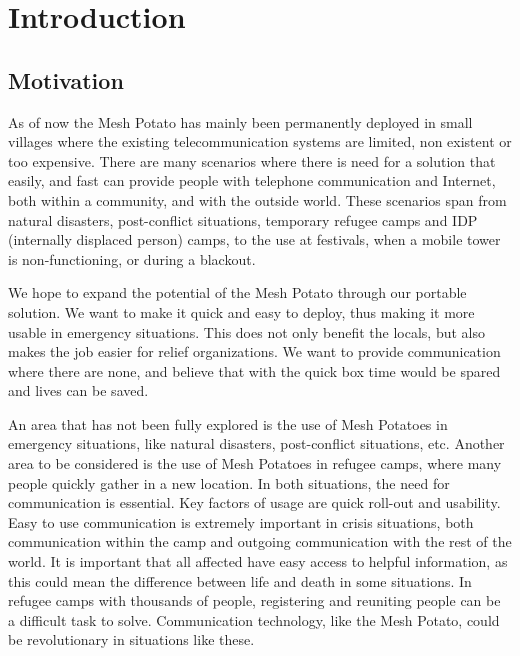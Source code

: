 \chapter{Introduction}
\label{chp:introduction} 

\section{Motivation}
As of now the Mesh Potato has mainly been permanently deployed in small villages where the existing telecommunication systems are limited, non existent or too expensive. There are many scenarios where there is need for a solution that easily, and fast can provide people with telephone communication and Internet, both within a community, and with the outside world. These scenarios span from natural disasters, post-conflict situations, temporary refugee camps and IDP (internally displaced person) camps, to the use at festivals, when a mobile tower is non-functioning, or during a blackout. 

We hope to expand the potential of the Mesh Potato through our portable solution. We want to make it quick and easy to deploy, thus making it more usable in emergency situations. This does not only benefit the locals, but also makes the job easier for relief organizations. 
We want to provide communication where there are none, and believe that with the \gls{quick} box time would be spared and lives can be saved.

An area that has not been fully explored is the use of Mesh Potatoes in emergency situations, like natural disasters, post-conflict situations, etc. Another area to be considered is the use of Mesh Potatoes in refugee camps, where many people quickly gather in a new location. In both situations, the need for communication is essential. Key factors of usage are quick roll-out and usability. Easy to use communication is extremely important in crisis situations, both communication within the camp and outgoing communication with the rest of the world. It is important that all affected have easy access to helpful information, as this could mean the difference between life and death in some situations. In refugee camps with thousands of people, registering and reuniting people can be a difficult task to solve. Communication technology, like the Mesh Potato, could be revolutionary in situations like these. 



